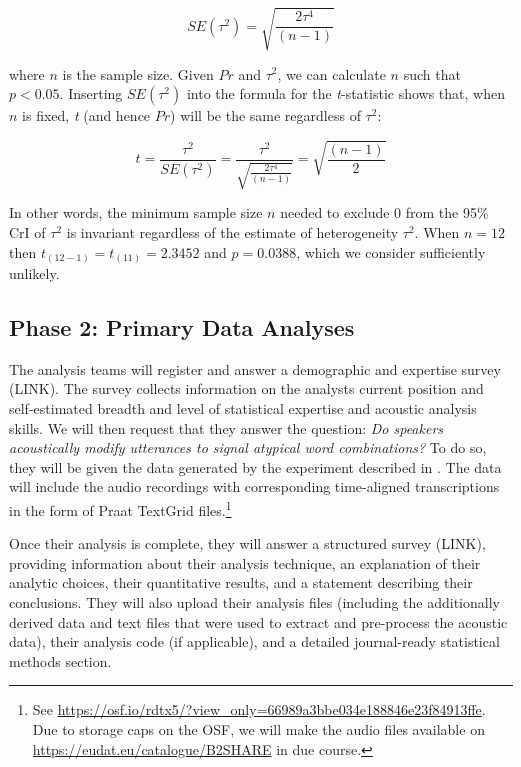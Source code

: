 \documentclass[
  12pt,
]{article}
\begin{document}
\[SE(\tau^2) = \sqrt{\frac{2\tau^4}{(n-1)}}\]

where \(n\) is the sample size.
Given \(Pr\) and \(\tau^2\), we can calculate \(n\) such that \(p < 0.05\).
Inserting \(SE(\tau^2)\) into the formula for the \emph{t}-statistic shows that, when \(n\) is fixed, \emph{t} (and hence \(Pr\)) will be the same regardless of \(\tau^2\):

\[t = \frac{\tau^2}{SE(\tau^2)} = \frac{\tau^2}{\sqrt{\frac{2\tau^4}{(n-1)}}} = \sqrt{\frac{(n-1)}{2}}\]

In other words, the minimum sample size \(n\) needed to exclude 0 from the 95\% CrI of \(\tau^2\) is invariant regardless of the estimate of heterogeneity \(\tau^2\).
When \(n = 12\) then \(t_{(12-1)} = t_{(11)} = 2.3452\) and \(p = 0.0388\), which we consider sufficiently unlikely.

\hypertarget{phase-2-primary-data-analyses}{%
\subsection{Phase 2: Primary Data Analyses}\label{phase-2-primary-data-analyses}}

The analysis teams will register and answer a demographic and expertise survey (LINK).
The survey collects information on the analysts current position and self-estimated breadth and level of statistical expertise and acoustic analysis skills.
We will then request that they answer the question: \emph{Do speakers acoustically modify utterances to signal atypical word combinations?}
To do so, they will be given the data generated by the experiment described in .
The data will include the audio recordings with corresponding time-aligned transcriptions in the form of Praat TextGrid files.\footnote{See \url{https://osf.io/rdtx5/?view_only=66989a3bbe034e188846e23f84913ffe}. Due to storage caps on the OSF, we will make the audio files available on \url{https://eudat.eu/catalogue/B2SHARE} in due course.}

Once their analysis is complete, they will answer a structured survey (LINK), providing information about their analysis technique, an explanation of their analytic choices, their quantitative results, and a statement describing their conclusions.
They will also upload their analysis files (including the additionally derived data and text files that were used to extract and pre-process the acoustic data), their analysis code (if applicable), and a detailed journal-ready statistical methods section.
\end{document}
